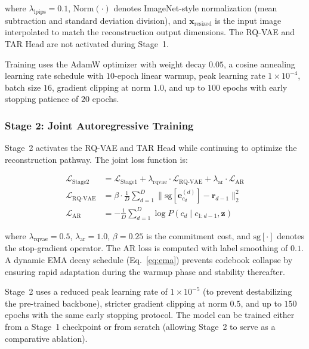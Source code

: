 \documentclass[lettersize,journal]{IEEEtran}
\begin{document}
where $\lambda_{\text{lpips}} = 0.1$, $\text{Norm}(\cdot)$ denotes ImageNet-style normalization (mean subtraction and standard deviation division), and $\mathbf{x}_{\text{resized}}$ is the input image interpolated to match the reconstruction output dimensions. The RQ-VAE and TAR Head are not activated during Stage~1.

Training uses the AdamW optimizer with weight decay $0.05$, a cosine annealing learning rate schedule with $10$-epoch linear warmup, peak learning rate $1 \times 10^{-4}$, batch size $16$, gradient clipping at norm $1.0$, and up to $100$ epochs with early stopping patience of $20$ epochs.

\subsubsection{Stage 2: Joint Autoregressive Training}

Stage~2 activates the RQ-VAE and TAR Head while continuing to optimize the reconstruction pathway. The joint loss function is:

\begin{equation}
\label{eq:loss_stage2}
\begin{aligned}
\mathcal{L}_{\text{Stage2}} &= \mathcal{L}_{\text{Stage1}} + \lambda_{\text{rqvae}} \cdot \mathcal{L}_{\text{RQ-VAE}} + \lambda_{\text{ar}} \cdot \mathcal{L}_{\text{AR}} \\
\mathcal{L}_{\text{RQ-VAE}} &= \beta \cdot \frac{1}{D} \sum_{d=1}^{D} \|\text{sg}[\mathbf{e}^{(d)}_{c_d}] - \mathbf{r}_{d-1}\|_2^2 \\
\mathcal{L}_{\text{AR}} &= -\frac{1}{D} \sum_{d=1}^{D} \log P(c_d \mid c_{1:d-1}, \mathbf{z})
\end{aligned}
\end{equation}

where $\lambda_{\text{rqvae}} = 0.5$, $\lambda_{\text{ar}} = 1.0$, $\beta = 0.25$ is the commitment cost, and $\text{sg}[\cdot]$ denotes the stop-gradient operator. The AR loss is computed with label smoothing of $0.1$. A dynamic EMA decay schedule (Eq.~\ref{eq:ema}) prevents codebook collapse by ensuring rapid adaptation during the warmup phase and stability thereafter.

Stage~2 uses a reduced peak learning rate of $1 \times 10^{-5}$ (to prevent destabilizing the pre-trained backbone), stricter gradient clipping at norm $0.5$, and up to $150$ epochs with the same early stopping protocol. The model can be trained either from a Stage~1 checkpoint or from scratch (allowing Stage~2 to serve as a comparative ablation).
\end{document}
